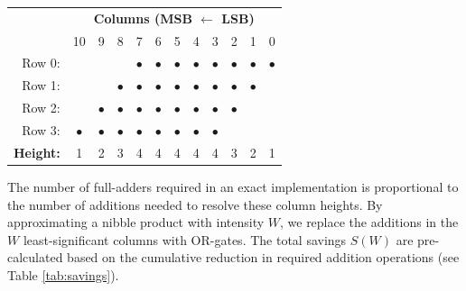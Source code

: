 \documentclass[a4paper,11pt]{article}
\begin{document}
\begin{center}

  \begin{tabular}{rccccccccccc}

                     & \multicolumn{11}{c}{\textbf{Columns (MSB $\gets$ LSB)}}                                                                                                                         \\

                     & 10                                                      & 9         & 8         & 7         & 6         & 5         & 4         & 3         & 2         & 1         & 0         \\

    \midrule

    Row 0:           &                                                         &           &           & $\bullet$ & $\bullet$ & $\bullet$ & $\bullet$ & $\bullet$ & $\bullet$ & $\bullet$ & $\bullet$ \\

    Row 1:           &                                                         &           & $\bullet$ & $\bullet$ & $\bullet$ & $\bullet$ & $\bullet$ & $\bullet$ & $\bullet$ & $\bullet$ &           \\

    Row 2:           &                                                         & $\bullet$ & $\bullet$ & $\bullet$ & $\bullet$ & $\bullet$ & $\bullet$ & $\bullet$ & $\bullet$ &           &           \\

    Row 3:           & $\bullet$                                               & $\bullet$ & $\bullet$ & $\bullet$ & $\bullet$ & $\bullet$ & $\bullet$ & $\bullet$ &           &           &           \\

    \midrule

    \textbf{Height:} & 1                                                       & 2         & 3         & 4         & 4         & 4         & 4         & 4         & 3         & 2         & 1         \\
  \end{tabular}

\end{center}

The number of full-adders required in an exact implementation is proportional to the number of additions needed to resolve these column heights. By approximating a nibble product with intensity $W$, we replace the additions in the $W$ least-significant columns with OR-gates. The total savings $S(W)$ are pre-calculated based on the cumulative reduction in required addition operations (see Table \ref{tab:savings}).
\end{document}
